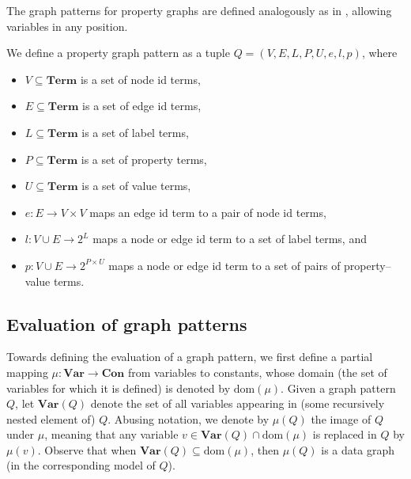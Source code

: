 The graph patterns for property graphs are defined analogously as in , allowing variables in any position.
    
\begin{definition}\label{def:property-graph-pattern}
    We define a property graph pattern as a tuple $Q = (V, E, L, P, U, e, l, p)$, where
    \begin{itemize}
        \item $V \subseteq \textbf{Term}$ is a set of node id terms,
        \item $E \subseteq \textbf{Term}$ is a set of edge id terms,
        \item $L \subseteq \textbf{Term}$ is a set of label terms,
        \item $P \subseteq \textbf{Term}$ is a set of property terms,
        \item $U \subseteq \textbf{Term}$ is a set of value terms,
        \item $e : E \to V \times V$ maps an edge id term to a pair of node id terms,
        \item $l : V \cup E \to 2^L$ maps a node or edge id term to a set of label terms, and
        \item $p : V \cup E \to 2^{P \times U}$ maps a node or edge id term to a set of pairs of property–value terms.
    \end{itemize}
\end{definition}

\subsection{Evaluation of graph patterns}
Towards defining the evaluation of a graph pattern, we first define a partial mapping $\mu : \textbf{Var} \to \textbf{Con}$ from variables to constants, whose domain (the set of variables for which it is defined) is denoted by $\text{dom}(\mu)$. Given a graph pattern $Q$, let $\textbf{Var}(Q)$ denote the set of all variables appearing in (some recursively nested element of) $Q$. Abusing notation, we denote by $\mu(Q)$ the image of $Q$ under $\mu$, meaning that any variable $v \in \textbf{Var}(Q) \cap \text{dom}(\mu)$ is replaced in $Q$ by $\mu(v)$. Observe that when $\textbf{Var}(Q) \subseteq \text{dom}(\mu)$, then $\mu(Q)$ is a data graph (in the corresponding model of $Q$).

